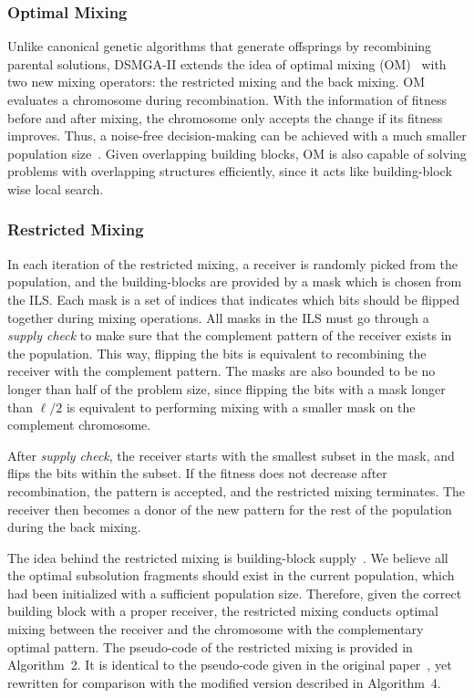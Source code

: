 \documentclass{sig-alternate-05-2015}
\begin{document}
\subsubsection{Optimal Mixing}
Unlike canonical genetic algorithms that generate offsprings by recombining parental solutions, DSMGA-II extends the idea of optimal mixing (OM)~\cite{thierens:OM} with two new mixing operators: the restricted mixing and the back mixing. OM evaluates a chromosome during recombination. With the information of fitness before and after mixing, the chromosome only accepts the change if its fitness improves. Thus, a noise-free decision-making can be achieved with a much smaller population size~\cite{goldberg:buildingblock}. Given overlapping building blocks, OM is also capable of solving problems with overlapping structures efficiently, since it acts like building-block wise local search.


\subsubsection{Restricted Mixing}

In each iteration of the restricted mixing, a receiver is randomly picked from the population, and the building-blocks are provided by a mask which is chosen from the ILS. 
Each mask is a set of indices that indicates which bits should be flipped together during mixing operations. 
All masks in the ILS must go through a \textit{supply check} to make sure that the complement pattern of the receiver exists in the population. 
This way, flipping the bits is equivalent to recombining the receiver with the complement pattern. 
The masks are also bounded to be no longer than half of the problem size, since flipping the bits with a mask longer than $\ell/2$ is equivalent to performing mixing with a smaller mask on the complement chromosome. 


After \textit{supply check}, the receiver starts with the smallest subset in the mask, and flips the bits within the subset. 
If the fitness does not decrease after recombination, the pattern is accepted, and the restricted mixing terminates. 
The receiver then becomes a donor of the new pattern for the rest of the population during the back mixing. 


The idea behind the restricted mixing is building-block supply~\cite{goldberg:buildingblock}. We believe all the optimal subsolution fragments should exist in the current population, which had been initialized with a sufficient population size. Therefore, given the correct building block with a proper receiver, the restricted mixing conducts optimal mixing between the receiver and the chromosome with the complementary optimal pattern. 
The pseudo-code of the restricted mixing is provided in Algorithm~2.
It is identical to the pseudo-code given in the original paper~\cite{hsu:DSMGA2}, yet rewritten for comparison with the modified version described in Algorithm~4. 
\end{document}
